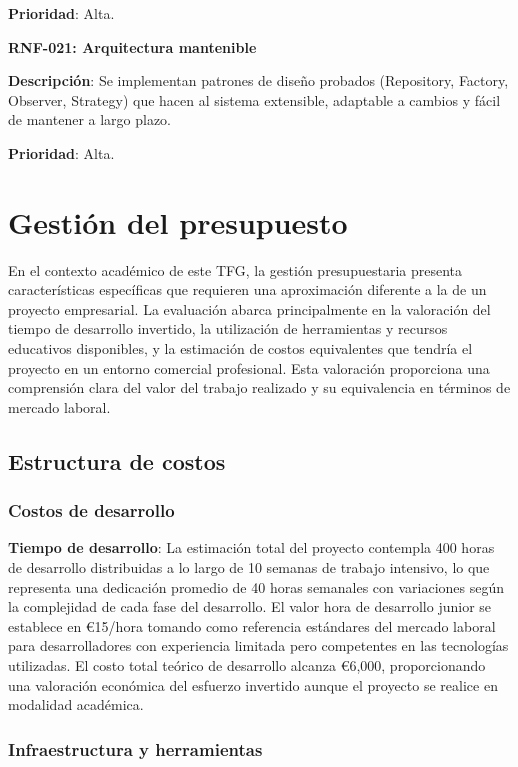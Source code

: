 \documentclass[12pt,a4paper,oneside]{report}
\begin{document}
\textbf{Prioridad}: Alta.

\textbf{RNF-021: Arquitectura mantenible}\label{arquitectura-mantenible}

\textbf{Descripción}: Se implementan patrones de diseño probados (Repository, Factory, Observer, Strategy) que hacen al sistema extensible, adaptable a cambios y fácil de mantener a largo plazo.

\textbf{Prioridad}: Alta.

\section{Gestión del presupuesto}\label{gestiuxf3n-del-presupuesto}

En el contexto académico de este TFG, la gestión presupuestaria presenta características específicas que requieren una aproximación diferente a la de un proyecto empresarial. La evaluación abarca principalmente en la valoración del tiempo de desarrollo invertido, la utilización de herramientas y recursos educativos disponibles, y la estimación de costos equivalentes que tendría el proyecto en un entorno comercial profesional. Esta valoración proporciona una comprensión clara del valor del trabajo realizado y su equivalencia en términos de mercado laboral.

\subsection{Estructura de costos}\label{estructura-de-costos}

\subsubsection{Costos de desarrollo}\label{costos-de-desarrollo}

\textbf{Tiempo de desarrollo}: La estimación total del proyecto contempla 400 horas de desarrollo distribuidas a lo largo de 10 semanas de trabajo intensivo, lo que representa una dedicación promedio de 40 horas semanales con variaciones según la complejidad de cada fase del desarrollo. El valor hora de desarrollo junior se establece en €15/hora tomando como referencia estándares del mercado laboral para desarrolladores con experiencia limitada pero competentes en las tecnologías utilizadas. El costo total teórico de desarrollo alcanza €6,000, proporcionando una valoración económica del esfuerzo invertido aunque el proyecto se realice en modalidad académica.

\subsubsection{Infraestructura y
herramientas}\label{infraestructura-y-herramientas}
\end{document}
